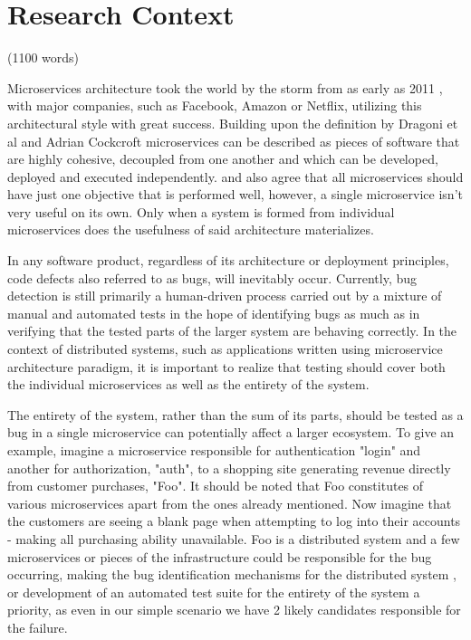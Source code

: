 \chapter{Research Context}
(1100 words)

Microservices architecture took the world by the storm from as early as 2011 \cite{fowlerOnMicroservices}, with major companies, such as Facebook, Amazon or Netflix, utilizing this architectural style with great success. 
Building upon the definition by Dragoni et al \cite{dragoniOnMs} and Adrian Cockcroft \cite{understandingOfMicroservices} microservices can be described as pieces of software that are highly cohesive, decoupled from one another and which can be developed, deployed and executed independently. \cite{dragoniOnMs} and \cite{understandingOfMicroservices} also agree that all microservices should have just one objective that is performed well, however, a single microservice isn't very useful on its own. Only when a system is formed from individual microservices does the usefulness of said architecture materializes.

In any software product, regardless of its architecture or deployment principles, code defects also referred to as bugs, will inevitably occur. Currently, bug detection is still primarily a human-driven process carried out by a mixture of manual and automated tests in the hope of identifying bugs as much as in verifying that the tested parts of the larger system are behaving correctly. In the context of distributed systems, such as applications written using microservice architecture paradigm, it is important to realize that testing should cover both the individual microservices as well as the entirety of the system.

The entirety of the system, rather than the sum of its parts, should be tested as a bug in a single microservice can potentially affect a larger ecosystem. To give an example, imagine a microservice responsible for authentication "login" and another for authorization, "auth", to a shopping site generating revenue directly from customer purchases, "Foo". It should be noted that Foo constitutes of various microservices apart from the ones already mentioned. Now imagine that the customers are seeing a blank page when attempting to log into their accounts - making all purchasing ability unavailable. Foo is a distributed system and a few microservices or pieces of the infrastructure could be responsible for the bug occurring, making the bug identification mechanisms for the distributed system , or development of an automated test suite for the entirety of the system a priority, as even in our simple scenario we have 2 likely candidates responsible for the failure. 

